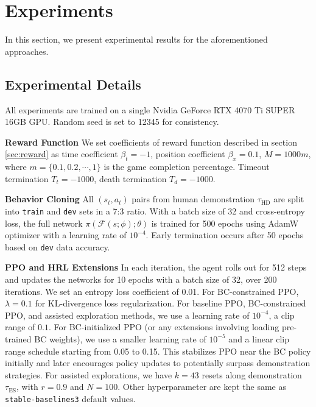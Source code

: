 \documentclass{article}
\begin{document}
\section{Experiments}
In this section, we present experimental results for the aforementioned 
approaches. 

\subsection{Experimental Details}
All experiments are trained on a single Nvidia GeForce RTX 4070 Ti 
SUPER 16GB GPU. Random seed is set to 12345 for consistency.

\textbf{Reward Function} We set coefficients of reward function described
in section \ref{sec:reward} as time coefficient $\beta_t = -1$, 
position coefficient $\beta_x = 0.1$, 
$M=1000m$, where $m=\{0.1, 0.2, \cdots, 1\}$ is the game completion percentage.
Timeout termination $T_t = -1000$, death termination $T_d = -1000$.

\textbf{Behavior Cloning} All $(s_t, a_t)$ 
pairs from human demonstration $\tau_{\text{HD}}$ are split into \texttt{train} and \texttt{dev} sets in a 7:3 ratio. 
With a batch size of 32 and cross-entropy loss, the full network 
$\pi(\mathcal{F}(s; \phi);\theta)$ is trained for 500 epochs using 
AdamW optimizer with a learning rate of $10^{-4}$. Early termination 
occurs after 50 epochs based on \texttt{dev} data accuracy.

\textbf{PPO and HRL Extensions} In each iteration, the agent rolls out for 
512 steps and updates the networks for 10 epochs with a batch size of 32, 
over 200 iterations. We set an entropy loss coefficient of 0.01. For 
BC-constrained PPO, $\lambda=0.1$ for KL-divergence loss regularization. For 
baseline PPO, BC-constrained PPO, and assisted exploration methods, we use 
a learning rate of $10^{-4}$, a clip range of $0.1$. For BC-initialized 
PPO (or any extensions involving loading pre-trained BC weights), 
we use a smaller learning rate of $10^{-5}$ and a linear clip 
range schedule starting from 0.05 to 0.15. This stabilizes PPO near the BC 
policy initially and later encourages policy updates to potentially surpass 
demonstration strategies. For assisted explorations, we have $k=43$ resets 
along demonstration $\tau_{\text{ES}}$, with $r=0.9$ and $N=100$.
Other hyperparameter are kept the same as \texttt{stable-baselines3} default values.
\end{document}
